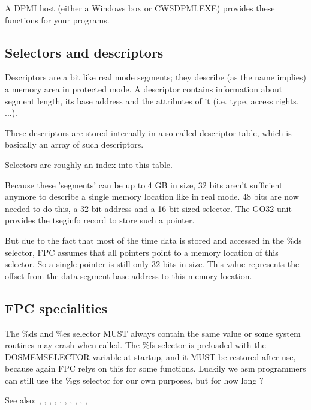 A DPMI host (either a Windows \dos box or CWSDPMI.EXE) provides these
functions for your programs.

\subsection{Selectors and descriptors}

Descriptors are a bit like real mode segments; they describe (as the name
implies) a memory area in protected mode. A descriptor contains information
about segment length, its base address and the attributes of it (i.e. type,
access rights, ...).

These descriptors are stored internally in a so-called descriptor table,
which is basically an array of such descriptors.

Selectors are roughly an index into this table.

Because these 'segments' can be up to 4 GB in size, 32 bits aren't
sufficient anymore to describe a single memory location like in real mode.
48 bits are now needed to do this, a 32 bit address and a 16 bit sized
selector. The GO32 unit provides the tseginfo record to store such a
pointer.

But due to the fact that most of the time data is stored and accessed in the
\%ds selector, FPC assumes that all pointers point to a memory location of
this selector. So a single pointer is still only 32 bits in size. This value
represents the offset from the data segment base address to this memory
location.

\subsection{FPC specialities}

The \%ds and \%es selector MUST always contain the same value or some system
routines may crash when called. The \%fs selector is preloaded with the
DOSMEMSELECTOR variable at startup, and it MUST be restored after use,
because again FPC relys on this for some functions. Luckily we asm
programmers can still use the \%gs selector for our own purposes, but for how
long ?

See also:
 , 
 ,
 , 
 ,
 ,
 ,
 ,
 ,
 ,
 ,

